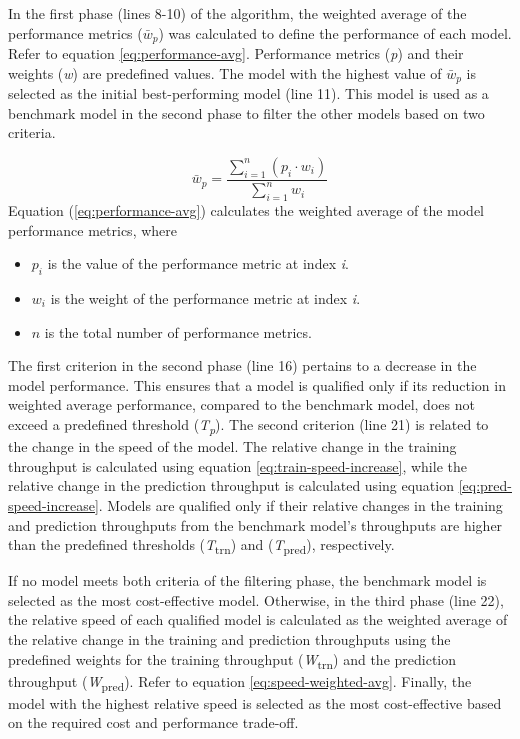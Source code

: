 In the first phase (lines 8-10) of the algorithm, the weighted average of the performance metrics ($\bar{w}_p$) was calculated to define the performance of each model. Refer to equation \eqref{eq:performance-avg}. Performance metrics (\textit{p}) and their weights (\textit{w}) are predefined values. The model with the highest value of $\bar{w}_p$ is selected as the initial best-performing model (line 11). This model is used as a benchmark model in the second phase to filter the other models based on two criteria.

\begin{equation}
    \bar{w}_p = \frac{\sum_{i=1}^{n} (p_i \cdot w_i)}{\sum_{i=1}^{n} w_i}
    \label{eq:performance-avg}
\end{equation}
Equation (\ref{eq:performance-avg}) calculates the weighted average of the model performance metrics, where
\begin{itemize}
    \item $p_i$ is the value of the performance metric at index \textit{i}.
    \item $w_i$ is the weight of the performance metric at index \textit{i}. 
    \item $n$ is the total number of performance metrics.
\end{itemize}
\vspace{2em}

The first criterion in the second phase (line 16) pertains to a decrease in the model performance. This ensures that a model is qualified only if its reduction in weighted average performance, compared to the benchmark model, does not exceed a predefined threshold (\textit{T\textsubscript{p}}). The second criterion (line 21) is related to the change in the speed of the model. The relative change in the training throughput is calculated using equation \eqref{eq:train-speed-increase}, while the relative change in the prediction throughput is calculated using equation \eqref{eq:pred-speed-increase}. Models are qualified only if their relative changes in the training and prediction throughputs from the benchmark model's throughputs are higher than the predefined thresholds (\textit{T}\textsubscript{trn}) and (\textit{T}\textsubscript{pred}), respectively. 

If no model meets both criteria of the filtering phase, the benchmark model is selected as the most cost-effective model. Otherwise, in the third phase (line 22), the relative speed of each qualified model is calculated as the weighted average of the relative change in the training and prediction throughputs using the predefined weights for the training throughput (\textit{W}\textsubscript{trn}) and the prediction throughput (\textit{W}\textsubscript{pred}). Refer to equation \eqref{eq:speed-weighted-avg}. Finally, the model with the highest relative speed is selected as the most cost-effective based on the required cost and performance trade-off.

